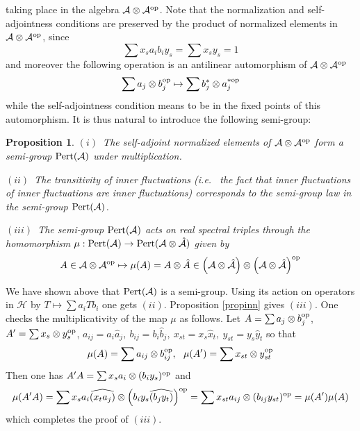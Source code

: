 \documentclass[preprint]{revtex4}
\newtheorem{prop}[thm]{Proposition}
\begin{document}
taking place in the algebra ${\mathcal{A}}\otimes {\mathcal{A}}^{\rm op}$.
 \endproof
 Note that the normalization and  self-adjointness conditions are preserved by the product of normalized elements in ${\mathcal{A}}\otimes {\mathcal{A}}^{\rm op}$, since
 \begin{equation*}
    \sum x_sa_ib_iy_s=\sum x_sy_s=1
 \end{equation*}
and moreover the following operation is an antilinear automorphism of ${\mathcal{A}}\otimes {\mathcal{A}}^{\rm op}$
\begin{equation*}
   \sum a_j\otimes b_j^{\rm op}\mapsto \sum b_j^*\otimes a_j^{*\rm op}
\end{equation*}
while the self-adjointness condition means to be in the fixed points of this automorphism.
It is thus natural to introduce the following semi-group:
\begin{prop}
$(i)$~The self-adjoint normalized elements of ${\mathcal{A}}\otimes {\mathcal{A}}^{\rm op}$ form a semi-group ${{\rm Pert}}({\mathcal{A}})$ under multiplication.

$(ii)$~The transitivity of inner fluctuations ({{\it i.e.\/}\ } the fact that inner fluctuations of inner fluctuations are inner fluctuations) corresponds to the semi-group law in the semi-group ${{\rm Pert}}({\mathcal{A}})$.

$(iii)$~The semi-group ${{\rm Pert}}({\mathcal{A}})$ acts on real spectral triples through the homomorphism $\mu:{{\rm Pert}}({\mathcal{A}})\to {{\rm Pert}}({\mathcal{A}}\otimes \hat {\mathcal{A}})$ given by
\begin{equation}\label{mult}
    A\in {\mathcal{A}}\otimes {\mathcal{A}}^{\rm op}\mapsto \mu(A)= A\otimes \hat A\in \left({\mathcal{A}}\otimes \hat {\mathcal{A}}\right)\otimes \left({\mathcal{A}}\otimes \hat {\mathcal{A}}\right)^{\rm op}
\end{equation}
\end{prop}
\proof We have shown above that ${{\rm Pert}}({\mathcal{A}})$ is a semi-group. Using its action on operators in ${\mathcal{H}}$  by
$T\mapsto \sum a_iTb_i$ one gets $(ii)$.  Proposition \ref{propinn} gives $(iii)$.  One checks the multiplicativity of the map $\mu$ as follows. Let $A=\sum a_j\otimes b_j^{\rm op}$, $A'=\sum x_s\otimes y_s^{\rm op}$,
$   a_{ij}=a_i\hat a_j,\  b_{ij}=b_i\hat b_j,\
    x_{st}=x_s\hat x_t,\   y_{st}=y_s\hat y_t$
    so that
    \begin{equation*}
        \mu(A)=\sum a_{ij}\otimes b_{ij}^{\rm op}, \ \ \mu(A')=\sum x_{st}\otimes y_{st}^{\rm op}
    \end{equation*}
    Then one has $A'A=\sum x_sa_i\otimes (b_iy_s)^{\rm op}$ and
\begin{equation*}
  \mu(  A'A)=\sum x_sa_i\widehat{(x_ta_j)}\otimes \left(b_iy_s\widehat{(b_jy_t)}\right)^{\rm op}
  =\sum x_{st}a_{ij}\otimes (b_{ij}y_{st})^{\rm op}=\mu(A')\mu(A)
\end{equation*}
which completes the proof of $(iii)$.\endproof
\end{document}
